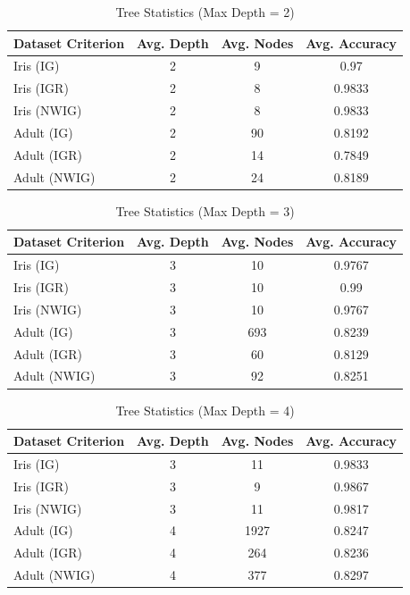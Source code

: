 \documentclass{article}
\begin{document}
\begin{table}[H]
\centering
\caption{Tree Statistics (Max Depth = 2)}
\begin{tabular}{lccc}
\toprule
\multicolumn{1}{l}{\textbf{Dataset \newline Criterion}} & \textbf{Avg. Depth} & \textbf{Avg. Nodes} & \textbf{Avg. Accuracy} \\
\midrule
Iris (IG) & 2 & 9 & 0.97 \\
Iris (IGR) & 2 & 8 & 0.9833 \\
Iris (NWIG) & 2 & 8 & 0.9833 \\
\midrule
Adult (IG) & 2 & 90 & 0.8192 \\
Adult (IGR) & 2 & 14 & 0.7849 \\
Adult (NWIG) & 2 & 24 & 0.8189 \\
\bottomrule
\end{tabular}
\label{tab:depth2}
\end{table}

\begin{table}[H]
\centering
\caption{Tree Statistics (Max Depth = 3)}
\begin{tabular}{lccc}
\toprule
\multicolumn{1}{l}{\textbf{Dataset \newline Criterion}} & \textbf{Avg. Depth} & \textbf{Avg. Nodes} & \textbf{Avg. Accuracy} \\
\midrule
Iris (IG) & 3 & 10 & 0.9767 \\
Iris (IGR) & 3 & 10 & 0.99 \\
Iris (NWIG) & 3 & 10 & 0.9767 \\
\midrule
Adult (IG) & 3 & 693 & 0.8239 \\
Adult (IGR) & 3 & 60 & 0.8129 \\
Adult (NWIG) & 3 & 92 & 0.8251 \\
\bottomrule
\end{tabular}
\label{tab:depth3}
\end{table}

\begin{table}[H]
\centering
\caption{Tree Statistics (Max Depth = 4)}
\begin{tabular}{lccc}
\toprule
\multicolumn{1}{l}{\textbf{Dataset \newline Criterion}} & \textbf{Avg. Depth} & \textbf{Avg. Nodes} & \textbf{Avg. Accuracy} \\
\midrule
Iris (IG) & 3 & 11 & 0.9833 \\
Iris (IGR) & 3 & 9 & 0.9867 \\
Iris (NWIG) & 3 & 11 & 0.9817 \\
\midrule
Adult (IG) & 4 & 1927 & 0.8247 \\
Adult (IGR) & 4 & 264 & 0.8236 \\
Adult (NWIG) & 4 & 377 & 0.8297 \\
\bottomrule
\end{tabular}
\label{tab:depth4}
\end{table}
\end{document}

